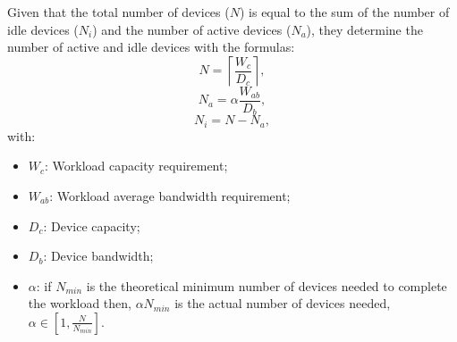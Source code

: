 Given that the total number of devices ($N$) is equal to the sum of the number of idle devices ($N_i$) and the number of active devices ($N_a$), they determine the number of active and idle devices with the formulas:
%
\begin{equation}
    N = \left \lceil {\frac{W_c}{D_c}} \right \rceil,
\end{equation}
\begin{equation}
    N_a = \alpha \frac{W_{ab}}{D_b},
\end{equation}
\begin{equation}
    N_i = N - N_a,
\end{equation}
with:
\begin{itemize}
    \item $W_c$: Workload capacity requirement;
    \item $W_{ab}$: Workload average bandwidth requirement;
    \item $D_c$: Device capacity;
    \item $D_b$: Device bandwidth;
    \item $\alpha$: if $N_{min}$ is the theoretical minimum number of devices needed to complete the workload then, $\alpha N_{min}$ is the actual number of devices needed, $\alpha \in [1,\frac{N}{N_{min}}]$.
\end{itemize}







